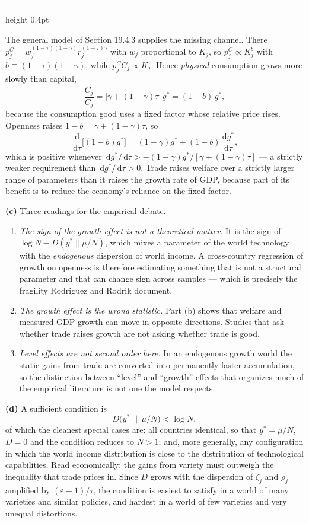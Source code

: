 \documentclass[11pt,letterpaper,reqno]{amsart}
\makeatletter
\newcommand{\dd}{\,\mathrm{d}}
\newcommand{\dt}[1]{\dot{#1}}
\newcommand{\as@head}[3]{%
  \par\addvspace{1.6ex}\penalty-200\relax
  \phantomsection
  \addcontentsline{toc}{subsection}{#1 #2\texorpdfstring{\ifx\relax#3\relax\else\quad #3\fi}{}}%
  {\color{RuleGrey}\hrule height 0.4pt}%
  \nobreak\vspace{0.8ex}\nobreak
  \noindent{\bfseries #1 #2}%
  \ifx\relax#3\relax\else\quad{\bfseries\itshape #3}\fi
  \par\nobreak\vspace{0.4ex}\nobreak
  \as@beginstatement
}
\newcommand{\as@beginstatement}{\begingroup\itshape\ignorespaces}
\newenvironment{aex}[2]{\as@head{Exercise}{#1}{#2}}{\par\addvspace{1.2ex}}
\renewcommand{\as@beginstatement}{\ignorespaces}
\makeatother
\begin{document}
\begin{aex}{19.23}{}
The general model of Section 19.4.3 supplies the missing channel.  There
$p^C_j=w_j^{(1-\tau)(1-\gamma)}r_j^{(1-\tau)\gamma}$ with $w_j$ proportional to $K_j$, so
$p^C_j\propto K_j^{b}$ with $b\equiv(1-\tau)(1-\gamma)$, while $p^C_jC_j\propto K_j$.  Hence
\emph{physical} consumption grows more slowly than capital,
\[
\boxed{\ \frac{\dt C_j}{C_j}=\bigl[\gamma+(1-\gamma)\tau\bigr]\,g^*=(1-b)\,g^* , \ }
\]
because the consumption good uses a fixed factor whose relative price rises.  Openness raises
$1-b=\gamma+(1-\gamma)\tau$, so
\[
\frac{\dd}{\dd\tau}\bigl[(1-b)g^*\bigr]=(1-\gamma)g^*+(1-b)\frac{\dd g^*}{\dd\tau} ,
\]
which is positive whenever $\dd g^*/\dd\tau>-(1-\gamma)g^*/[\gamma+(1-\gamma)\tau]$ --- a strictly
weaker requirement than $\dd g^*/\dd\tau>0$.  Trade raises welfare over a strictly larger range of
parameters than it raises the growth rate of GDP, because part of its benefit is to reduce the
economy's reliance on the fixed factor.

\textbf{(c)}  Three readings for the empirical debate.
\begin{enumerate}
\item \emph{The sign of the growth effect is not a theoretical matter.}  It is the sign of
      $\log N-D(y^*\|\mu/N)$, which mixes a parameter of the world technology with the
      \emph{endogenous} dispersion of world income.  A cross-country regression of growth on
      openness is therefore estimating something that is not a structural parameter and that
      can change sign across samples --- which is precisely the fragility Rodriguez and Rodrik
      document.
\item \emph{The growth effect is the wrong statistic.}  Part (b) shows that welfare and measured
      GDP growth can move in opposite directions.  Studies that ask whether trade raises growth
      are not asking whether trade is good.
\item \emph{Level effects are not second order here.}  In an endogenous growth world the static
      gains from trade are converted into permanently faster accumulation, so the distinction
      between ``level'' and ``growth'' effects that organizes much of the empirical literature is
      not one the model respects.
\end{enumerate}

\textbf{(d)}  A sufficient condition is
\[
D\bigl(y^*\,\big\|\,\mu/N\bigr)<\log N ,
\]
of which the cleanest special cases are: all countries identical, so that $y^*=\mu/N$, $D=0$ and
the condition reduces to $N>1$; and, more generally, any configuration in which the world income
distribution is close to the distribution of technological capabilities.  Read economically: the
gains from variety must outweigh the inequality that trade prices in.  Since $D$ grows with the
dispersion of $\zeta_j$ and $\rho_j$ amplified by $(\varepsilon-1)/\tau$, the condition is easiest
to satisfy in a world of many varieties and similar policies, and hardest in a world of few
varieties and very unequal distortions.
\end{aex}
\end{document}
